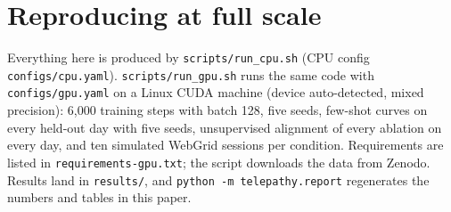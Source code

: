 \documentclass[10pt,twocolumn]{article}
\begin{document}
\section{Reproducing at full scale}
Everything here is produced by \texttt{scripts/run\_cpu.sh} (CPU config \texttt{configs/cpu.yaml}).
\texttt{scripts/run\_gpu.sh} runs the same code with \texttt{configs/gpu.yaml} on a Linux CUDA
machine (device auto-detected, mixed precision): 6{,}000 training steps with batch 128, five seeds,
few-shot curves on every held-out day with five seeds, unsupervised alignment of every ablation on
every day, and ten simulated WebGrid sessions per condition. Requirements are listed in
\texttt{requirements-gpu.txt}; the script downloads the data from Zenodo. Results land in
\texttt{results/}, and \texttt{python -m telepathy.report} regenerates the numbers and tables in this paper.

{\small


}
\end{document}
